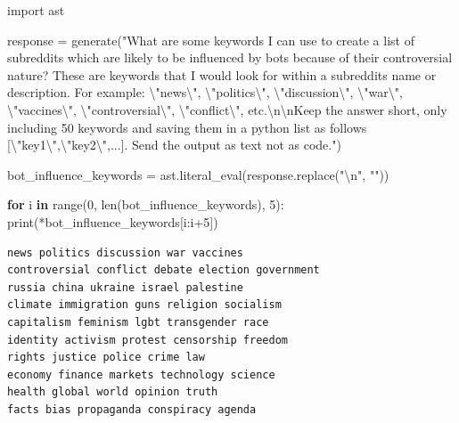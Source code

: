 \documentclass[
  12pt,
  letterpaper,
  DIV=11,
  numbers=noendperiod]{scrartcl}
\newenvironment{Shaded}{\begin{snugshade}}{\end{snugshade}}
\newcommand{\BuiltInTok}[1]{\textcolor[rgb]{0.00,0.23,0.31}{#1}}
\newcommand{\CharTok}[1]{\textcolor[rgb]{0.13,0.47,0.30}{#1}}
\newcommand{\ControlFlowTok}[1]{\textcolor[rgb]{0.00,0.23,0.31}{\textbf{#1}}}
\newcommand{\DecValTok}[1]{\textcolor[rgb]{0.68,0.00,0.00}{#1}}
\newcommand{\ImportTok}[1]{\textcolor[rgb]{0.00,0.46,0.62}{#1}}
\newcommand{\KeywordTok}[1]{\textcolor[rgb]{0.00,0.23,0.31}{\textbf{#1}}}
\newcommand{\NormalTok}[1]{\textcolor[rgb]{0.00,0.23,0.31}{#1}}
\newcommand{\OperatorTok}[1]{\textcolor[rgb]{0.37,0.37,0.37}{#1}}
\newcommand{\StringTok}[1]{\textcolor[rgb]{0.13,0.47,0.30}{#1}}
\begin{document}
\begin{Shaded}
\begin{Highlighting}[]
\ImportTok{import}\NormalTok{ ast}

\NormalTok{response }\OperatorTok{=}\NormalTok{ generate(}\StringTok{"What are some keywords I can use to create a list of subreddits which are likely to be influenced by bots because of their controversial nature? These are keywords that I would look for within a subreddit\textquotesingle{}s name or description. For example: }\CharTok{\textbackslash{}"}\StringTok{news}\CharTok{\textbackslash{}"}\StringTok{, }\CharTok{\textbackslash{}"}\StringTok{politics}\CharTok{\textbackslash{}"}\StringTok{, }\CharTok{\textbackslash{}"}\StringTok{discussion}\CharTok{\textbackslash{}"}\StringTok{, }\CharTok{\textbackslash{}"}\StringTok{war}\CharTok{\textbackslash{}"}\StringTok{, }\CharTok{\textbackslash{}"}\StringTok{vaccines}\CharTok{\textbackslash{}"}\StringTok{, }\CharTok{\textbackslash{}"}\StringTok{controversial}\CharTok{\textbackslash{}"}\StringTok{, }\CharTok{\textbackslash{}"}\StringTok{conflict}\CharTok{\textbackslash{}"}\StringTok{, etc.}\CharTok{\textbackslash{}n\textbackslash{}n}\StringTok{Keep the answer short, only including 50 keywords and saving them in a python list as follows [}\CharTok{\textbackslash{}"}\StringTok{key1}\CharTok{\textbackslash{}"}\StringTok{,}\CharTok{\textbackslash{}"}\StringTok{key2}\CharTok{\textbackslash{}"}\StringTok{,...]. Send the output as text not as code."}\NormalTok{)}

\NormalTok{bot\_influence\_keywords }\OperatorTok{=}\NormalTok{ ast.literal\_eval(response.replace(}\StringTok{"}\CharTok{\textbackslash{}n}\StringTok{"}\NormalTok{, }\StringTok{""}\NormalTok{))}

\ControlFlowTok{for}\NormalTok{ i }\KeywordTok{in} \BuiltInTok{range}\NormalTok{(}\DecValTok{0}\NormalTok{, }\BuiltInTok{len}\NormalTok{(bot\_influence\_keywords), }\DecValTok{5}\NormalTok{):}
    \BuiltInTok{print}\NormalTok{(}\OperatorTok{*}\NormalTok{bot\_influence\_keywords[i:i}\OperatorTok{+}\DecValTok{5}\NormalTok{])}
\end{Highlighting}
\end{Shaded}

\begin{verbatim}
news politics discussion war vaccines
controversial conflict debate election government
russia china ukraine israel palestine
climate immigration guns religion socialism
capitalism feminism lgbt transgender race
identity activism protest censorship freedom
rights justice police crime law
economy finance markets technology science
health global world opinion truth
facts bias propaganda conspiracy agenda
\end{verbatim}
\end{document}

